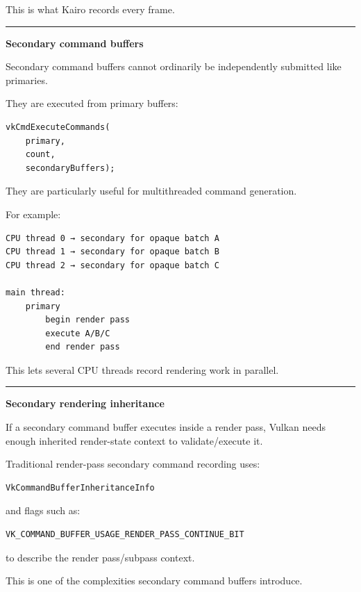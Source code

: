 This is what Kairo records every frame.

\begin{center}\rule{0.5\linewidth}{0.5pt}\end{center}

\textbf{Secondary command buffers}

Secondary command buffers cannot ordinarily be independently submitted like primaries.

They are executed from primary buffers:

\begin{verbatim}
vkCmdExecuteCommands(
    primary,
    count,
    secondaryBuffers);
\end{verbatim}

They are particularly useful for multithreaded command generation.

For example:

\begin{verbatim}
CPU thread 0 → secondary for opaque batch A
CPU thread 1 → secondary for opaque batch B
CPU thread 2 → secondary for opaque batch C

main thread:
    primary
        begin render pass
        execute A/B/C
        end render pass
\end{verbatim}

This lets several CPU threads record rendering work in parallel.

\begin{center}\rule{0.5\linewidth}{0.5pt}\end{center}

\textbf{Secondary rendering inheritance}

If a secondary command buffer executes inside a render pass, Vulkan needs enough inherited render-state context to validate/execute it.

Traditional render-pass secondary command recording uses:

\begin{verbatim}
VkCommandBufferInheritanceInfo
\end{verbatim}

and flags such as:

\begin{verbatim}
VK_COMMAND_BUFFER_USAGE_RENDER_PASS_CONTINUE_BIT
\end{verbatim}

to describe the render pass/subpass context.

This is one of the complexities secondary command buffers introduce.

